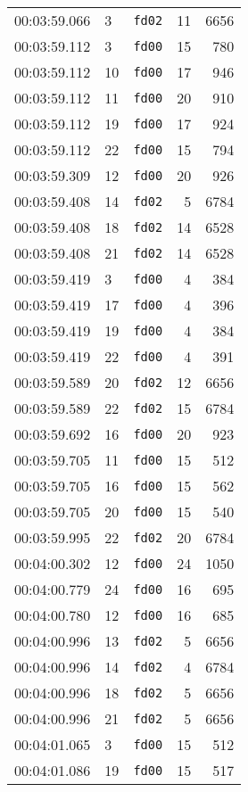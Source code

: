 \documentclass{article}
\begin{document}
\begin{longtable}{lllrr}
00:03:59.066 & 3 & \texttt{fd02} & 11 & 6656 \\
00:03:59.112 & 3 & \texttt{fd00} & 15 & 780 \\
00:03:59.112 & 10 & \texttt{fd00} & 17 & 946 \\
00:03:59.112 & 11 & \texttt{fd00} & 20 & 910 \\
00:03:59.112 & 19 & \texttt{fd00} & 17 & 924 \\
00:03:59.112 & 22 & \texttt{fd00} & 15 & 794 \\
00:03:59.309 & 12 & \texttt{fd00} & 20 & 926 \\
00:03:59.408 & 14 & \texttt{fd02} & 5 & 6784 \\
00:03:59.408 & 18 & \texttt{fd02} & 14 & 6528 \\
00:03:59.408 & 21 & \texttt{fd02} & 14 & 6528 \\
00:03:59.419 & 3 & \texttt{fd00} & 4 & 384 \\
00:03:59.419 & 17 & \texttt{fd00} & 4 & 396 \\
00:03:59.419 & 19 & \texttt{fd00} & 4 & 384 \\
00:03:59.419 & 22 & \texttt{fd00} & 4 & 391 \\
00:03:59.589 & 20 & \texttt{fd02} & 12 & 6656 \\
00:03:59.589 & 22 & \texttt{fd02} & 15 & 6784 \\
00:03:59.692 & 16 & \texttt{fd00} & 20 & 923 \\
00:03:59.705 & 11 & \texttt{fd00} & 15 & 512 \\
00:03:59.705 & 16 & \texttt{fd00} & 15 & 562 \\
00:03:59.705 & 20 & \texttt{fd00} & 15 & 540 \\
00:03:59.995 & 22 & \texttt{fd02} & 20 & 6784 \\
00:04:00.302 & 12 & \texttt{fd00} & 24 & 1050 \\
00:04:00.779 & 24 & \texttt{fd00} & 16 & 695 \\
00:04:00.780 & 12 & \texttt{fd00} & 16 & 685 \\
00:04:00.996 & 13 & \texttt{fd02} & 5 & 6656 \\
00:04:00.996 & 14 & \texttt{fd02} & 4 & 6784 \\
00:04:00.996 & 18 & \texttt{fd02} & 5 & 6656 \\
00:04:00.996 & 21 & \texttt{fd02} & 5 & 6656 \\
00:04:01.065 & 3 & \texttt{fd00} & 15 & 512 \\
00:04:01.086 & 19 & \texttt{fd00} & 15 & 517 \\

\end{longtable}
\end{document}
